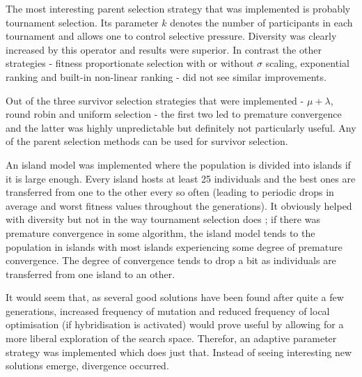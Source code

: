 
The most interesting parent selection strategy that was implemented is probably tournament selection. Its parameter $k$ denotes the number of participants in each tournament and allows one to control selective pressure. Diversity was clearly increased by this operator and results were superior. In contrast the other strategies - fitness proportionate selection with or without $\sigma$ scaling, exponential ranking and built-in non-linear ranking - did not see similar improvements.


Out of the three survivor selection strategies that were implemented - $\mu+\lambda$, round robin and uniform selection - the first two led to premature convergence and the latter was highly unpredictable but definitely not particularly useful. Any of the parent selection methods can be used for survivor selection.


An island model was implemented where the population is divided into islands if it is large enough. Every island hosts at least 25 individuals and the best ones are transferred from one to the other every so often (leading to periodic drops in average and worst fitness values throughout the generations). It obviously helped with diversity but not in the way tournament selection does ; if there was premature convergence in some algorithm, the island model tends to the population in islands with most islands experiencing some degree of premature convergence. The degree of convergence tends to drop a bit as individuals are transferred from one island to an other.


It would seem that, as several good solutions have been found after quite a few generations, increased frequency of mutation and reduced frequency of local optimisation (if hybridisation is activated) would prove useful by allowing for a more liberal exploration of the search space. Therefor, an adaptive parameter strategy was implemented which does just that. Instead of seeing interesting new solutions emerge, divergence occurred.


